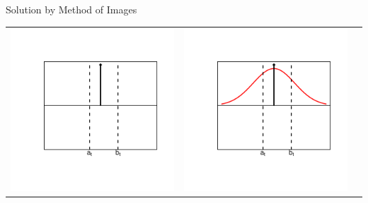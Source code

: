 \documentclass{beamer}
\begin{document}
\begin{frame}{Solution by Method of Images}
\pause

\begin{centering}
\vspace{-15mm}
\begin{tabular}{ccc}
\hspace{-10mm}
\begin{minipage}{0.3\textwidth}
	\includegraphics[scale=0.4,angle=0]{./section-2-figures/ic.pdf}
\end{minipage}
\pause

&

\begin{minipage}{0.3\textwidth}
	\includegraphics[scale=0.4,angle=0]{./section-2-figures/g0.pdf}
\end{minipage}
\pause


\end{tabular}
\end{centering}
\end{frame}
\end{document}
